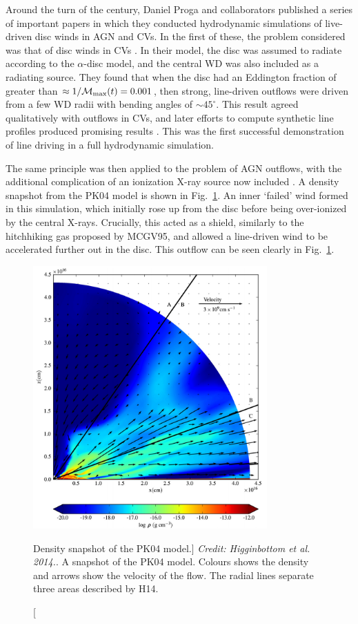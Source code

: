 Around the turn of the century, Daniel Proga and collaborators 
published a series of important papers in which they conducted 
hydrodynamic simulations of live-driven disc winds in AGN and CVs. 
In the first of these, the problem considered was that of disc
winds in CVs \citep{proga1998}. In their model, the disc was assumed
to radiate according to the $\alpha$-disc model, and the central WD was also included
as a radiating source. They found that when the disc had an Eddington fraction 
of greater than $\approx 1 / {\cal M}_{\mathrm{max}} (t) = 0.001$, then strong, line-driven
outflows were driven from a few WD radii with bending angles of $\sim45^\circ$.
This result agreed qualitatively with outflows in CVs, and later efforts to compute
synthetic line profiles produced promising results \citep{proga2002}. This was the
first successful demonstration of line driving in a full hydrodynamic simulation.

The same principle was then applied to the problem of AGN outflows, with the
additional complication of an ionization X-ray source now included 
\citep[][hereafter PK04]{PSK2000,PK04}. A density snapshot from the PK04 model
is shown in Fig.~\ref{fig:PK04}. An inner `failed' wind formed in this simulation,
which initially rose up from the disc before being over-ionized by the central X-rays.
Crucially, this acted as a shield, similarly to the hitchhiking gas proposed by
MCGV95, and allowed a line-driven wind to be accelerated further out in the disc. 
This outflow can be seen clearly in Fig.~\ref{fig:PK04}.

\begin{figure}
\centering
\includegraphics[width=0.8\textwidth]{figures/02-outflows/pk04_h14.png}
\caption
[Density snapshot of the PK04 model.]
{
{\sl Credit: Higginbottom et al. 2014.}. 
A snapshot of the PK04 model. Colours shows the density and 
arrows show the velocity of the flow. 
The radial lines separate three areas described by H14.
} 
\label{fig:PK04}
\end{figure}

